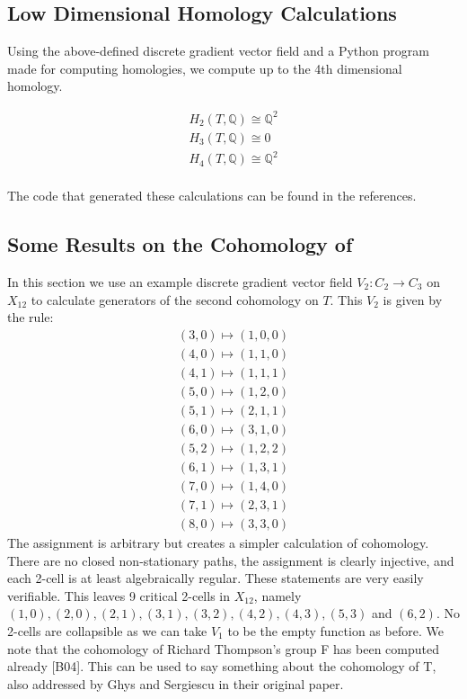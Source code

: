\documentclass{amsart}
\newcommand{\bq}{\ensuremath{\mathbb{Q}}} %
\begin{document}
\subsection{Low Dimensional Homology Calculations}

Using the above-defined discrete gradient vector field and a Python program made for computing homologies, we compute up to the 4th dimensional homology.

\begin{gather*}
H_{2}(T, \bq) \cong \bq^2\\
H_{3}(T, \bq) \cong 0\\
H_{4}(T, \bq) \cong \bq^2\\
\end{gather*}

The code that generated these calculations can be found in the references.

\subsection{Some Results on the Cohomology of }

In this section we use an example discrete gradient vector field $V_{2}: C_{2} \to C_{3}$ on $X_{12}$ to calculate generators of the second cohomology on $T$. This $V_{2}$ is given by the rule:
\begin{gather*}
(3,0) \mapsto (1,0,0)\\
(4,0) \mapsto (1,1,0)\\
(4,1) \mapsto (1,1,1)\\
(5,0) \mapsto (1,2,0)\\
(5,1) \mapsto (2,1,1)\\
(6,0) \mapsto (3,1,0)\\
(5,2) \mapsto (1,2,2)\\
(6,1) \mapsto (1,3,1)\\
(7,0) \mapsto (1,4,0)\\
(7,1) \mapsto (2,3,1)\\
(8,0) \mapsto (3,3,0)
\end{gather*}
The assignment is arbitrary but creates a simpler calculation of cohomology. There are no closed non-stationary paths, the assignment is clearly injective, and each 2-cell is at least algebraically regular. These statements are very easily verifiable. This leaves 9 critical 2-cells in $X_{12}$, namely $(1,0), (2,0), (2,1), (3,1), (3,2), (4,2), (4,3), (5,3)$ and $(6,2)$. No 2-cells are collapsible as we can take $V_{1}$ to be the empty function as before. We note that the cohomology of Richard Thompson's group F has been computed already [B04]. This can be used to say something about the cohomology of T, also addressed by Ghys and Sergiescu in their original paper. 
\end{document}
